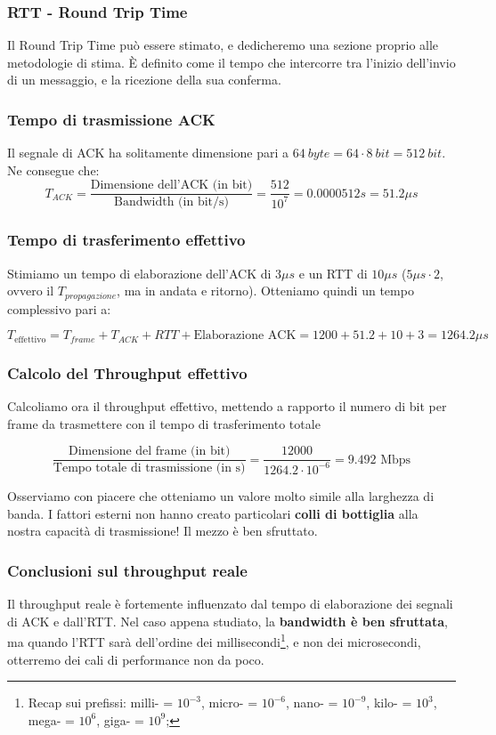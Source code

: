 \subsubsection{RTT - Round Trip Time}
Il Round Trip Time può essere stimato, e dedicheremo una sezione proprio alle metodologie di stima. È definito come il tempo che intercorre tra l'inizio dell'invio di un messaggio, e la ricezione della sua conferma.

\subsubsection{Tempo di trasmissione ACK}
Il segnale di ACK ha solitamente dimensione pari a $64 \ byte = 64 \cdot 8 \ bit = 512 \ bit$. Ne consegue che:
$$
T_{ACK} = \frac{\text{Dimensione dell'ACK (in bit)}}{\text{Bandwidth (in bit/s)}} = \frac{512}{10^7} = 0.0000512 s = 51.2  \mu s 
$$

\subsubsection{Tempo di trasferimento effettivo}

Stimiamo un tempo di elaborazione dell'ACK di $3 \mu s$ e un RTT di $10 \mu s$ ($5\mu s \cdot 2$, ovvero il $T_{propagazione}$, ma in andata e ritorno).
Otteniamo quindi un tempo complessivo pari a:

$$
T_\text{effettivo} = T_{frame} + T_{ACK} + RTT + \text{Elaborazione ACK} = 1200 + 51.2 + 10  + 3 =  1264.2 \mu s
$$

\subsubsection{Calcolo del Throughput effettivo}
Calcoliamo ora il throughput effettivo, mettendo a rapporto il numero di bit per frame da trasmettere con il tempo di trasferimento totale

$$
\frac{\text{Dimensione del frame (in bit)}}{\text{Tempo totale di trasmissione (in s)}} = \frac{12000}{1264.2 \cdot 10^{-6}} = 9.492 \text{ Mbps}
$$

Osserviamo con piacere che otteniamo un valore molto simile alla larghezza di banda. I fattori esterni non hanno creato particolari \textbf{colli di bottiglia} alla nostra capacità di trasmissione! Il mezzo è ben sfruttato.

\subsubsection{Conclusioni sul throughput reale}
Il throughput reale è fortemente influenzato dal tempo di elaborazione dei segnali di ACK e dall'RTT. Nel caso appena studiato, la \textbf{bandwidth è ben sfruttata}, ma quando l'RTT sarà dell'ordine dei millisecondi\footnote{Recap sui prefissi: milli- = $10^{-3}$, micro- = $10^{-6}$, nano- = $10^{-9}$, kilo- = $10^{3}$, mega- = $10^{6}$, giga- = $10^{9}$;}, e non dei microsecondi, otterremo dei cali di performance non da poco. 




